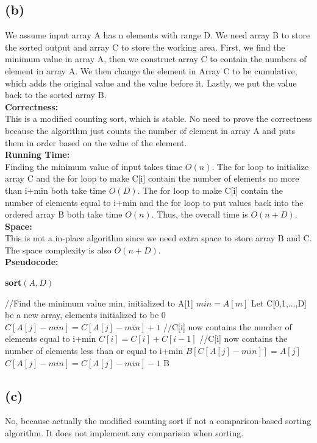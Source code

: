 \documentclass[twoside]{homework}
\begin{document}
\subsection*{(b)}
We assume input array A has n elements with range D. We need array B to store the sorted output and array C to store the working area. First, we find the minimum value in array A, then we construct array C to contain the numbers of element in array A. We then change the element in Array C to be cumulative, which adds the original value and the value before it. Lastly, we put the value back to the sorted array B.
\\\textbf{Correctness:} \quad
\\ This is a modified counting sort, which is stable. No need to prove the correctness because the algorithm just counts the number of element in array A and puts them in order based on the value of the element.
\\\textbf{Running Time:} \quad
\\Finding the minimum value of input takes time $O(n)$. The for loop to initialize array C and the for loop to make C[i] contain the number of elements no more than i+min both take time $O(D)$. The for loop to make C[i] contain the number of elements equal to i+min and the for loop to put values back into the ordered array B both take time $O(n)$. Thus, the overall time is $O(n+D)$.
\\\textbf{Space:} \quad
\\This is not a in-place algorithm since we need extra space to store array B and C. The space complexity is also $O(n+D)$.
\\\textbf{Pseudocode:} \quad
\begin{algorithm}
	\caption*{\textbf{sort$(A,D)$}}
	\begin{algorithmic}
		\STATE //Find the minimum value min, initialized to A[1]
		\STATE $min=A[m]$
		\ENDIF
		\ENDFOR
		\STATE Let C[0,1,...,D] be a new array, elements initialized to be 0
		\STATE $C[A[j]-min]=C[A[j]-min]+1$
		\ENDFOR
		\STATE //C[i] now contains the number of elements equal to i+min
		\STATE $C[i]=C[i]+C[i-1]$
		\ENDFOR
		\STATE //C[i] now contains the number of elements less than or equal to i+min
		\STATE $B[C[A[j]-min]]=A[j]$
		\STATE $C[A[j]-min]=C[A[j]-min]-1$
		\ENDFOR
		\RETURN B
	\end{algorithmic}		
\end{algorithm}
\subsection*{(c)}
No, because actually the modified counting sort if not a comparison-based sorting algorithm. It does not implement any comparison when sorting.
\end{document}
